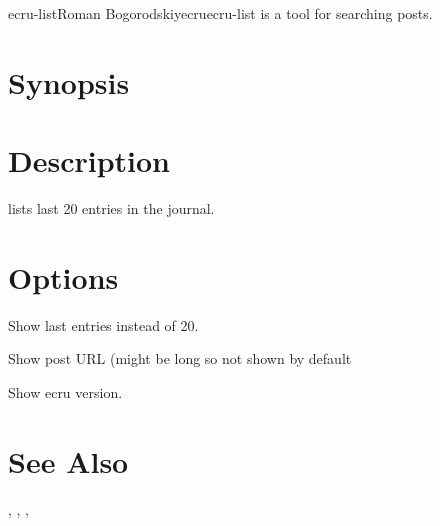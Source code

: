 \documentclass[english]{article}
\begin{document}
\begin{Name}{1}{ecru-list}{Roman Bogorodskiy}{ecru}{ecru-list}
	 is a tool for searching posts.
\end{Name}

\section{Synopsis}

  

 


\section{Description}
 lists last 20 entries in the journal. 
\section{Options}

\begin{Description}\setlength{\itemsep}{0cm}
\item[\OptArg{-c}{count}] Show  last entries instead of 20.
\item[\Opt{-s}] Show post URL (might be long so not shown by default
\item[\Opt{-v}] Show ecru version.
\end{Description}

\section{See Also}

, , , 
\end{document}
